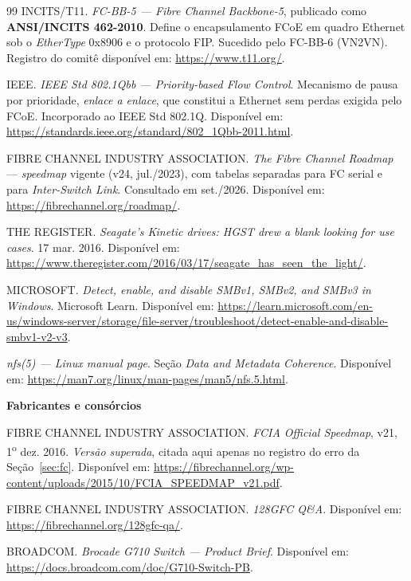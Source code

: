 \documentclass[11pt,a4paper]{article}
\begin{document}
\begin{thebibliography}{99}
 INCITS/T11. \textit{FC-BB-5 --- Fibre Channel Backbone-5}, publicado como
\textbf{ANSI/INCITS 462-2010}. Define o encapsulamento FCoE em quadro Ethernet sob o \textit{EtherType}
0x8906 e o protocolo FIP. Sucedido pelo FC-BB-6 (VN2VN). Registro do comitê disponível em:
\url{https://www.t11.org/}.

 IEEE. \textit{IEEE Std 802.1Qbb --- Priority-based Flow Control}. Mecanismo de
pausa por prioridade, \emph{enlace a enlace}, que constitui a Ethernet sem perdas exigida pelo FCoE.
Incorporado ao IEEE Std 802.1Q. Disponível em: \url{https://standards.ieee.org/standard/802_1Qbb-2011.html}.

 FIBRE CHANNEL INDUSTRY ASSOCIATION. \textit{The Fibre Channel Roadmap} ---
\textit{speedmap} vigente (v24, jul./2023), com tabelas separadas para FC serial e para
\textit{Inter-Switch Link}. Consultado em set./2026. Disponível em:
\url{https://fibrechannel.org/roadmap/}.

 THE REGISTER. \textit{Seagate's Kinetic drives: HGST drew a blank looking
for use cases}. 17 mar. 2016. Disponível em: \url{https://www.theregister.com/2016/03/17/seagate_has_seen_the_light/}.

 MICROSOFT. \textit{Detect, enable, and disable SMBv1, SMBv2, and SMBv3 in
Windows}. Microsoft Learn. Disponível em:
\url{https://learn.microsoft.com/en-us/windows-server/storage/file-server/troubleshoot/detect-enable-and-disable-smbv1-v2-v3}.

 \textit{nfs(5) --- Linux manual page}. Seção \textit{Data and Metadata Coherence}.
Disponível em: \url{https://man7.org/linux/man-pages/man5/nfs.5.html}.

\bigskip
\bibitem[Fabricantes]{}\textbf{\large Fabricantes e consórcios}

 FIBRE CHANNEL INDUSTRY ASSOCIATION. \textit{FCIA Official Speedmap}, v21,
1\textsuperscript{o} dez. 2016. \emph{Versão superada}, citada aqui apenas no registro do erro da
Seção~\ref{sec:fc}. Disponível em:
\url{https://fibrechannel.org/wp-content/uploads/2015/10/FCIA_SPEEDMAP_v21.pdf}.

 FIBRE CHANNEL INDUSTRY ASSOCIATION. \textit{128GFC Q\&A}. Disponível em:
\url{https://fibrechannel.org/128gfc-qa/}.

 BROADCOM. \textit{Brocade G710 Switch --- Product Brief}. Disponível em:
\url{https://docs.broadcom.com/doc/G710-Switch-PB}.


\end{thebibliography}
\end{document}
